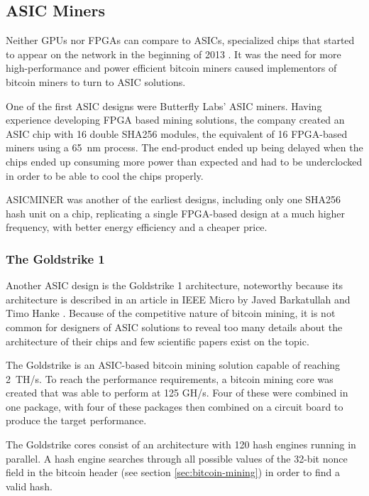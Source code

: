 \subsection{ASIC Miners}
\label{sec:asic}

Neither GPUs nor FPGAs can compare to ASICs, specialized chips that started to appear on the network
in the beginning of 2013 \cite{first-asic-miner}. It was the need for more high-performance and power
efficient bitcoin miners caused implementors of bitcoin miners to turn to ASIC solutions.

One of the first ASIC designs were Butterfly Labs' ASIC miners. Having experience developing
FPGA based mining solutions, the company created an ASIC chip with 16 double SHA256 modules,
the equivalent of 16 FPGA-based miners using a 65~nm process. The end-product ended up being
delayed when the chips ended up consuming more power than expected and had to be underclocked
in order to be able to cool the chips properly.

ASICMINER was another of the earliest designs, including only one SHA256 hash unit on a chip,
replicating a single FPGA-based design at a much higher frequency, with better energy efficiency
and a cheaper price. \cite{bespoke-silicon}

\subsubsection{The Goldstrike 1}
Another ASIC design is the Goldstrike 1 architecture, noteworthy because its architecture is
described in an article in IEEE Micro by Javed Barkatullah and Timo Hanke \cite{goldstrike}.
Because of the competitive nature of bitcoin mining, it is not common for designers of ASIC
solutions to reveal too many details about the architecture of their chips and few scientific
papers exist on the topic.

The Goldstrike is an ASIC-based bitcoin mining solution capable of reaching 2~TH/s. To reach the performance
requirements, a bitcoin mining core was created that was able to perform at 125 GH/s. Four of
these were combined in one package, with four of these packages then combined on a circuit board
to produce the target performance.

The Goldstrike cores consist of an architecture with 120 hash engines running in parallel.
A hash engine searches through all possible values of the 32-bit nonce field in the bitcoin header
(see section \ref{sec:bitcoin-mining}) in order to find a valid hash.

